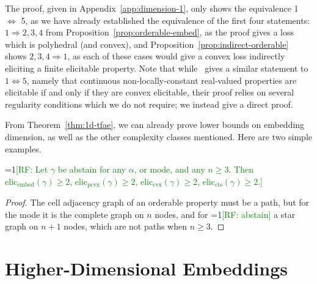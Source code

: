 \documentclass[anon,12pt]{colt2019}
\newcommand{\Comments}{1}
\newcommand{\mynote}[2]{\ifnum\Comments=1\textcolor{#1}{#2}\fi}
\newcommand{\raf}[1]{\mynote{green}{[RF: #1]}}
\newcommand{\eliccts}{\mathrm{elic}_\mathrm{cts}}
\newcommand{\eliccvx}{\mathrm{elic}_\mathrm{cvx}}
\newcommand{\elicpoly}{\mathrm{elic}_\mathrm{pcvx}}
\newcommand{\elicembed}{\mathrm{elic}_\mathrm{embed}}
\begin{document}
The proof, given in Appendix~\ref{app:dimension-1}, only shows the equivalence 1 $\Leftrightarrow$ 5, as we have already established the equivalence of the first four statements: $1 \Rightarrow 2,3,4$ from Proposition~\ref{prop:orderable-embed}, as the proof gives a loss which is polyhedral (and convex), and Proposition~\ref{prop:indirect-orderable} shows $2,3,4 \Rightarrow 1$, as each of these cases would give a convex loss indirectly eliciting a finite elicitable property.
Note that while~\citet{finocchiaro2018convex} gives a similar statement to $1\Leftrightarrow 5$, namely that continuous non-locally-constant real-valued properties are elicitable if and only if they are convex elicitable, their proof relies on several regularity conditions which we do not require; we instead give a direct proof.

From Theorem~\ref{thm:1d-tfae}, we can already prove lower bounds on embedding dimension, as well as the other complexity classes mentioned.
Here are two simple examples.
\begin{corollary}
  \raf{Let $\gamma$ be abstain for any $\alpha$, or $\mathrm{mode}$, and any $n\geq 3$.  Then
    $\elicembed(\gamma)\geq 2$,
    $\elicpoly(\gamma)\geq 2$,
    $\eliccvx(\gamma)\geq 2$,
    $\eliccts(\gamma)\geq 2$.}
\end{corollary}
\begin{proof}
  The cell adjacency graph of an orderable property must be a path, but for the mode it is the complete graph on $n$ nodes, and for \raf{abstain} a star graph on $n+1$ nodes, which are not paths when $n \geq 3$.
\end{proof}

\section{Higher-Dimensional Embeddings}\label{sec:general-dimensions}
\end{document}
